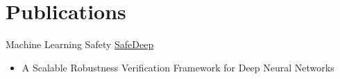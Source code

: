 \documentclass[letterpaper]{DS_class_file} %
\begin{document}
\begin{twenty}
	
	
\end{twenty}


\section{Publications}

\begin{twenty} %
    
	\twentyitem
	{Machine Learning}
	{Safety}
	{\hspace{0.3cm}\href{https://ieeexplore.ieee.org/document/10097028}{SafeDeep}}
	{}
	{}
	{
		{\begin{itemize}
				\item A Scalable Robustness Verification Framework for Deep Neural Networks
		\end{itemize}}
	}
	\\
	
	
	
\end{twenty}
\end{document}
